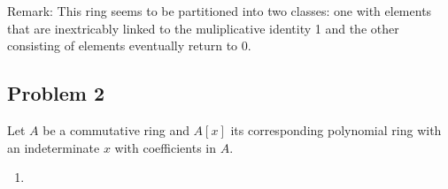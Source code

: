 \documentclass[12pt]{article}
\begin{document}
Remark: This ring seems to be partitioned into two classes: one with elements that are inextricably linked to the muliplicative identity 1 and the other consisting of elements eventually return to 0.
 
\subsection{Problem 2}

Let $A$ be a commutative ring and $A[x]$ its corresponding polynomial ring with an indeterminate $x$ with coefficients in $A$.
\begin{enumerate}
 \item 
\end{enumerate}
\end{document}
